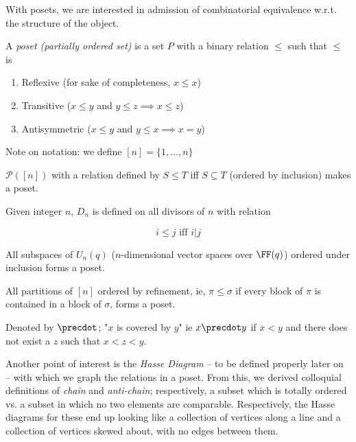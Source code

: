 \documentclass[../notes.tex]{subfiles}
\begin{document}
With posets, we are interested in admission of combinatorial equivalence w.r.t. the structure of the object.

\begin{definition}[Poset]
  A \textit{poset (partially ordered set)} is a set $P$ with a binary relation $\leq$ such that
  $\leq$ is

  \begin{enumerate}
    \item Reflexive (for sake of completeness, $x \leq x$)
    \item Transitive ($x \leq y$ and $y \leq z \implies x \leq z$)
    \item Antisymmetric ($x \leq y$ and $y \leq x \implies x = y$)
  \end{enumerate}
\end{definition}
\begin{remark}
  Note on notation: we define $[n] = \{1, \ldots, n\}$
\end{remark}

\begin{example}
  $\mathcal{P}([n])$ with a relation defined by $S \leq T$ iff $S \subseteq T$
  (ordered by inclusion) makes a poset.
\end{example}
\begin{example}[$D_n$]
  Given integer $n$, $D_n$ is defined on all divisors of $n$ with relation

  \begin{equation*}
    i \leq j \text{ iff } i | j
  \end{equation*}
\end{example}
\begin{example}[$L_n(q)$]
  All subspaces of $U_n(q)$ ($n$-dimensional vector spaces over $\FF(q)$) ordered under inclusion forms a poset.
\end{example}
\begin{example}[$\Pi_n$]
  All partitions of $[n]$ ordered by refinement, ie, $\pi \leq \sigma$ if every block of $\pi$ is contained in a block of $\sigma$, forms a poset.
\end{example}

\begin{definition}
  Denoted by $\precdot$; "$x$ is covered by $y$" ie $x \precdot y$ if $x < y$ and there does not exist a $z$ such that $x < z < y$.
\end{definition}


Another point of interest is the \textit{Hasse Diagram} -- to be defined properly later on -- with which 
we graph the relations in a poset. From this, we derived colloquial definitions of \textit{chain} and \textit{anti-chain};
respectively, a subset which is totally ordered vs. a subset in which no two elements are comparable. Respectively, the Hasse
diagrams for these end up looking like a collection of vertices along a line and a collection of vertices skewed about, with
no edges between them.
\end{document}
